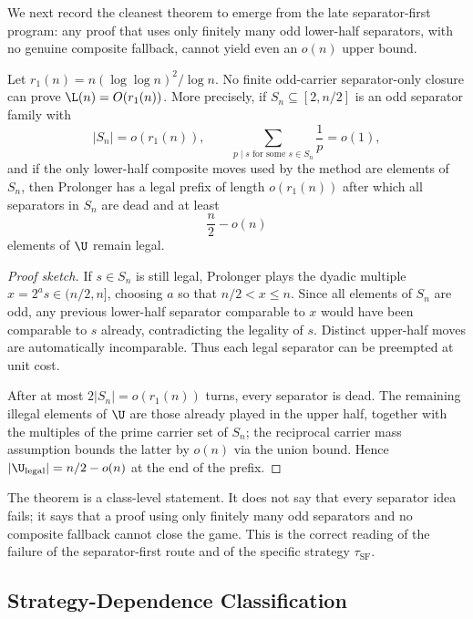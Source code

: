 We next record the cleanest theorem to emerge from the late
separator-first program: any proof that uses only finitely many odd
lower-half separators, with no genuine composite fallback, cannot yield even an
$o(n)$ upper bound.

\begin{theorem}\label{thm:separator-only}
Let $r_1(n)=n(\log\log n)^2/\log n$.  No finite odd-carrier
separator-only closure can prove $\L(n)=O(r_1(n))$.  More precisely, if
$S_n\subseteq [2,n/2]$ is an odd separator family with
\[
|S_n|=o(r_1(n)),
\qquad
\sum_{p\mid s\text{ for some }s\in S_n}\frac1p=o(1),
\]
and if the only lower-half composite moves used by the method are elements of
$S_n$, then Prolonger has a legal prefix of length $o(r_1(n))$ after which all
separators in $S_n$ are dead and at least
\[
\frac n2-o(n)
\]
elements of $\U$ remain legal.
\end{theorem}

\begin{proof}[Proof sketch]
If $s\in S_n$ is still legal, Prolonger plays the dyadic multiple
$x=2^a s\in (n/2,n]$, choosing $a$ so that $n/2<x\le n$.  Since all elements of
$S_n$ are odd, any previous lower-half separator comparable to $x$ would have
been comparable to $s$ already, contradicting the legality of $s$.  Distinct
upper-half moves are automatically incomparable.  Thus each legal separator can
be preempted at unit cost.

After at most $2|S_n|=o(r_1(n))$ turns, every separator is dead.  The remaining
illegal elements of $\U$ are those already played in the upper half, together
with the multiples of the prime carrier set of $S_n$; the reciprocal carrier
mass assumption bounds the latter by $o(n)$ via the union bound.  Hence
$|\U_{\mathrm{legal}}|=n/2-o(n)$ at the end of the prefix.
\end{proof}

\begin{remark}
The theorem is a class-level statement.  It does not say that every separator
idea fails; it says that a proof using only finitely many odd separators and no
composite fallback cannot close the game.  This is the correct reading of the
failure of the separator-first route and of the specific strategy
$\tau_{\mathrm{SF}}$.
\end{remark}

\subsection{Strategy-Dependence Classification}

